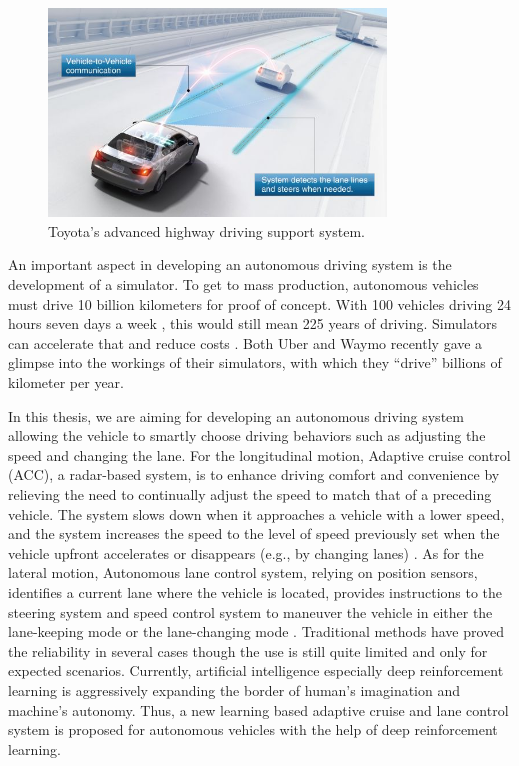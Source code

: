 \begin{figure}[h] 
\centering
\includegraphics[width=0.8\textwidth]{figs/ch1/highway-toyota}
\caption{Toyota's advanced highway driving support system.}
\label{fig:toyota}
\end{figure}

An important aspect in developing an autonomous driving system is the development of a simulator. To get to mass production, autonomous vehicles must drive 10 billion kilometers for proof of concept. With 100 vehicles driving 24 hours seven days a week , this would still mean 225 years of driving. Simulators can accelerate that and reduce costs \cite{Appolo2017} \cite{Dosovitskiy17}. Both Uber and Waymo recently gave a glimpse into the workings of their simulators, with which they ``drive'' billions of kilometer per year.


In this thesis, we are aiming for developing an autonomous driving system allowing the vehicle to smartly choose driving behaviors such as adjusting the speed and changing the lane. For the longitudinal motion, Adaptive cruise control (ACC), a radar-based system, is to enhance driving comfort and convenience by relieving the need to continually adjust the speed to match that of a preceding vehicle. The system slows down when it approaches a vehicle with a lower speed, and the system increases the speed to the level of speed previously set when the vehicle upfront accelerates or disappears (e.g., by changing lanes) \cite{ACC2002}. As for the lateral motion, Autonomous lane control system, relying on position sensors, identifies a current lane where the vehicle is located, provides instructions to the steering system and speed control system to maneuver the vehicle in either the lane-keeping mode or the lane-changing mode \cite{LaneControl2012}. Traditional methods have proved the reliability in several cases though the use is still quite limited and only for expected scenarios. Currently, artificial intelligence especially deep reinforcement learning is aggressively expanding the border of human's imagination and machine's autonomy. Thus, a new learning based adaptive cruise and lane control system is proposed for autonomous vehicles with the help of deep reinforcement learning.

